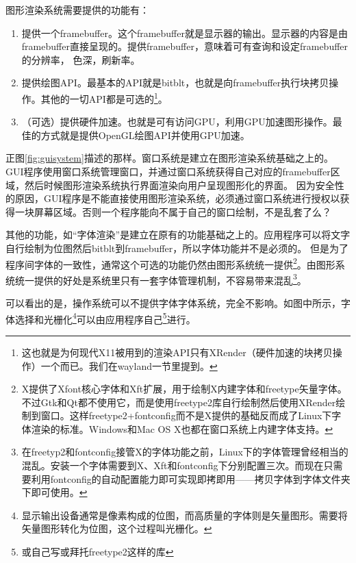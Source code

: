 \documentclass[amstex,twoside]{ctexbook}
\begin{document}
图形渲染系统需要提供的功能有：
\begin{enumerate}
\item	提供一个framebuffer。这个framebuffer就是显示器的输出。显示器的内容是由framebuffer直接呈现的。提供framebuffer，意味着可有查询和设定framebuffer的分辨率，
色深，刷新率。

\item	提供绘图API。最基本的API就是bitblt，也就是向framebuffer执行块拷贝操作。其他的一切API都是可选的\footnote{这也就是为何现代X11被用到的渲染API只有XRender（硬件加速的块拷贝操作）一个而已。我们在wayland一节里提到。}。

\item	（可选）提供硬件加速。也就是可有访问GPU，利用GPU加速图形操作。最佳的方式就是提供OpenGL绘图API并使用GPU加速。
\end{enumerate}

正图\ref{fig:guisystem}描述的那样。窗口系统是建立在图形渲染系统基础之上的。
GUI程序使用窗口系统管理窗口，并通过窗口系统获得自己对应的framebuffer区域，然后时候图形渲染系统执行界面渲染向用户呈现图形化的界面。
因为安全性的原因，GUI程序是不能直接使用图形渲染系统，必须通过窗口系统进行授权以获得一块屏幕区域。否则一个程序能向不属于自己的窗口绘制，不是乱套了么？


其他的功能，如“字体渲染”是建立在原有的功能基础之上的。应用程序可以将文字自行绘制为位图然后bitblt到framebuffer，所以字体功能并不是必须的。
但是为了程序间字体的一致性，通常这个可选的功能仍然由图形系统统一提供\footnote{X提供了Xfont核心字体和Xft扩展，用于绘制X内建字体和freetype矢量字体。不过Gtk和Qt都不使用它，而是使用freetype2库自行绘制然后使用XRender绘制到窗口。这样freetype2+fontconfig而不是X提供的基础反而成了Linux下字体渲染的标准。Windows{}和{}Mac OS X{}也都在窗口系统上内建字体支持。}。由图形系统统一提供的好处是系统里只有一套字体管理机制，不容易带来混乱\footnote{在freetyp2和fontconfig接管X的字体功能之前，Linux下的字体管理曾经相当的混乱。安装一个字体需要到X、Xft和fontconfig下分别配置三次。而现在只需要利用fontconfig的自动配置能力即可实现即拷即用——拷贝字体到字体文件夹下即可使用。}。


可以看出的是，操作系统可以不提供字体字体系统，完全不影响。如图中所示，字体选择和光栅化\footnote{显示输出设备通常是像素构成的位图，而高质量的字体则是矢量图形。需要将矢量图形转化为位图，这个过程叫光栅化。}可以由应用程序自己\footnote{或自己写或拜托freetype2这样的库}进行。
\end{document}
